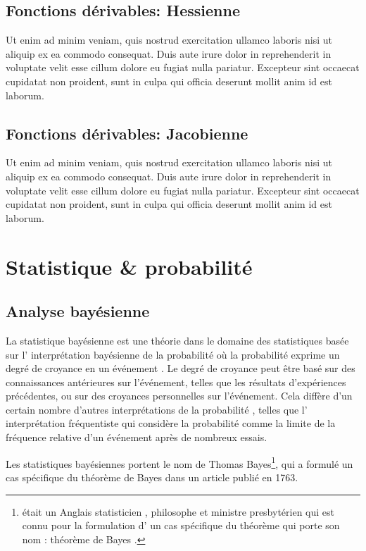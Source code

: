 	\subsection{Fonctions dérivables: Hessienne}
		Ut enim ad minim veniam, quis nostrud exercitation ullamco laboris nisi ut aliquip ex ea commodo consequat. Duis aute irure dolor in reprehenderit in voluptate velit esse cillum dolore eu fugiat nulla pariatur. Excepteur sint occaecat cupidatat non proident, sunt in culpa qui officia deserunt mollit anim id est laborum.
			
	\subsection{Fonctions dérivables: Jacobienne}
		Ut enim ad minim veniam, quis nostrud exercitation ullamco laboris nisi ut aliquip ex ea commodo consequat. Duis aute irure dolor in reprehenderit in voluptate velit esse cillum dolore eu fugiat nulla pariatur. Excepteur sint occaecat cupidatat non proident, sunt in culpa qui officia deserunt mollit anim id est laborum. 
		
		
	\section{Statistique \& probabilité}
		
	\subsection{Analyse bayésienne}
		La statistique bayésienne est une théorie dans le domaine des statistiques basée sur l' interprétation bayésienne de la probabilité où la probabilité exprime un degré de croyance en un événement . Le degré de croyance peut être basé sur des connaissances antérieures sur l'événement, telles que les résultats d'expériences précédentes, ou sur des croyances personnelles sur l'événement. Cela diffère d'un certain nombre d'autres interprétations de la probabilité , telles que l' interprétation fréquentiste qui considère la probabilité comme la limite de la fréquence relative d'un événement après de nombreux essais.
		
		Les statistiques bayésiennes portent le nom de Thomas Bayes\footnote{était un Anglais statisticien , philosophe et ministre presbytérien qui est connu pour la formulation d' un cas spécifique du théorème qui porte son nom : théorème de Bayes .}, qui a formulé un cas spécifique du théorème de Bayes dans un article publié en 1763.
		
